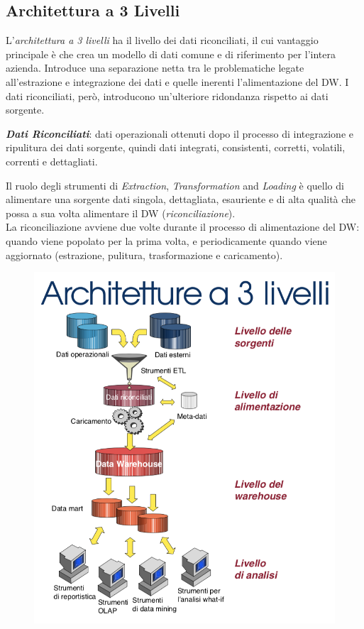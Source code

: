 \documentclass[a4paper, notitlepage, 9pt]{extreport}
\begin{document}
\subsection*{Architettura a 3 Livelli}
\begin{multicols}{2}
	L'\textit{architettura a 3 livelli} ha il livello dei dati riconciliati, il cui vantaggio principale è che crea un modello di dati comune e di riferimento per l'intera azienda. Introduce una separazione netta tra le problematiche legate all'estrazione e integrazione dei dati e quelle inerenti l'alimentazione del DW.
	I dati riconciliati, però, introducono un'ulteriore ridondanza rispetto ai dati sorgente.
	\newline
	
	\textit{\textbf{Dati Riconciliati}}: dati operazionali ottenuti dopo il processo di integrazione e ripulitura dei dati sorgente, quindi dati integrati, consistenti, corretti, volatili, correnti e dettagliati.
	\newline
	
	Il ruolo degli strumenti di \textit{Extraction}, \textit{Transformation} and \textit{Loading} è quello di alimentare una sorgente dati singola, dettagliata, esauriente e di alta qualità che possa a sua volta alimentare il DW (\textit{riconciliazione}).\\
	La riconciliazione avviene due volte durante il processo di alimentazione del DW: quando viene popolato per la prima volta, e periodicamente quando viene aggiornato (estrazione, pulitura, trasformazione e caricamento).
	\columnbreak
	\begin{figure}[H]
		\centering
		\includegraphics[scale=0.42]{Arch3Liv}
	\end{figure}
\end{multicols}
\end{document}
